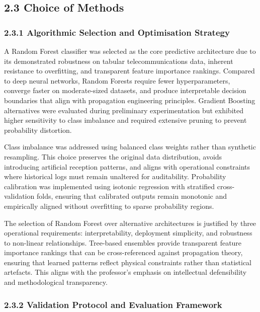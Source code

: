 \subsection{2.3 Choice of Methods}\label{choice-of-methods}

\subsubsection{2.3.1 Algorithmic Selection and Optimisation
Strategy}\label{algorithmic-selection-and-optimisation-strategy}

A Random Forest classifier was selected as the core predictive
architecture due to its demonstrated robustness on tabular
telecommunications data, inherent resistance to overfitting, and
transparent feature importance rankings. Compared to deep neural
networks, Random Forests require fewer hyperparameters, converge faster
on moderate-sized datasets, and produce interpretable decision
boundaries that align with propagation engineering principles. Gradient
Boosting alternatives were evaluated during preliminary experimentation
but exhibited higher sensitivity to class imbalance and required
extensive pruning to prevent probability distortion.

Class imbalance was addressed using balanced class weights rather than
synthetic resampling. This choice preserves the original data
distribution, avoids introducing artificial reception patterns, and
aligns with operational constraints where historical logs must remain
unaltered for auditability. Probability calibration was implemented
using isotonic regression with stratified cross-validation folds,
ensuring that calibrated outputs remain monotonic and empirically
aligned without overfitting to sparse probability regions.

The selection of Random Forest over alternative architectures is
justified by three operational requirements: interpretability,
deployment simplicity, and robustness to non-linear relationships.
Tree-based ensembles provide transparent feature importance rankings
that can be cross-referenced against propagation theory, ensuring that
learned patterns reflect physical constraints rather than statistical
artefacts. This aligns with the professor's emphasis on intellectual
defensibility and methodological transparency.

\subsubsection{2.3.2 Validation Protocol and Evaluation
Framework}\label{validation-protocol-and-evaluation-framework}

